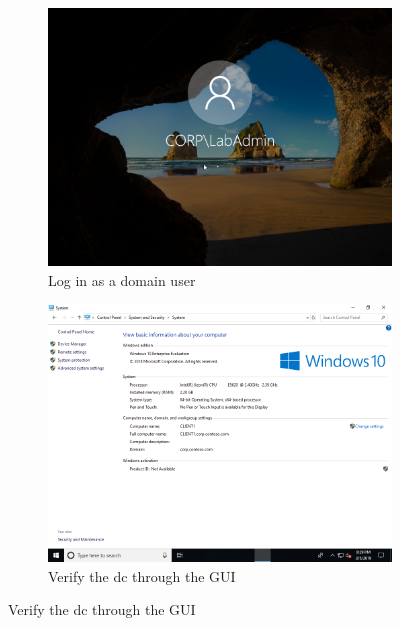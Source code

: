 \begin{figure}[h]
	\begin{subfigure}{0.5\textwidth}
		\captionsetup{width=0.8\linewidth}
		\includegraphics[width=0.9\linewidth]{img/Methodologie/Prerequisites1.png}
		\centering
		\caption{Log in as a domain user}
	\end{subfigure}
	\begin{subfigure}{0.5\textwidth}
		\captionsetup{width=0.8\linewidth}
		\includegraphics[width=0.9\linewidth]{img/Methodologie/Prerequisites2.png} 
		\centering
		\caption{Verify the \acrshort{dc} through the GUI}
	\end{subfigure}
\end{figure}
